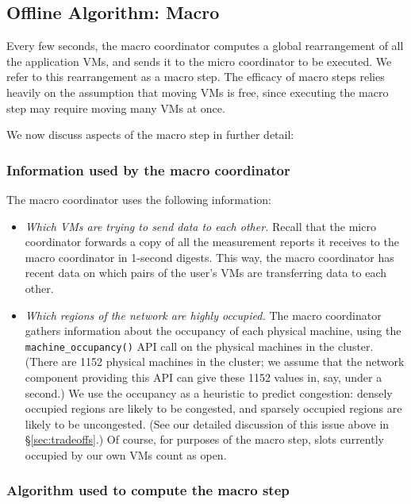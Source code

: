 \documentclass[11pt]{article}
\begin{document}
\FloatBarrier

\subsection{Offline Algorithm: Macro}

Every few seconds, the macro coordinator computes a global rearrangement of all the application VMs, and sends it to the micro coordinator to be executed.  We refer to this rearrangement as a macro step.  The efficacy of macro steps relies heavily on the assumption that moving VMs is free, since executing the macro step may require moving many VMs at once.

We now discuss aspects of the macro step in further detail:

\subsubsection{Information used by the macro coordinator}

The macro coordinator uses the following information:

\begin{itemize}
  \item {\em Which VMs are trying to send data to each other.}  Recall that the micro coordinator forwards a copy of all the measurement reports it receives to the macro coordinator in 1-second digests.  This way, the macro coordinator has recent data on which pairs of the user's VMs are transferring data to each other.
    
  \item {\em Which regions of the network are highly occupied.}  The macro coordinator gathers information about the occupancy of each physical machine, using the \texttt{machine\_occupancy()} API call on the physical machines in the cluster.  (There are 1152 physical machines in the cluster; we assume that the network component providing this API can give these 1152 values in, say, under a second.)   We use the occupancy as a heuristic to predict congestion: densely occupied regions are likely to be congested, and sparsely occupied regions are likely to be uncongested.  (See our detailed discussion of this issue above in \S\ref{sec:tradeoffs}.)  Of course, for purposes of the macro step, slots currently occupied by our own VMs count as open.
\end{itemize}

\subsubsection{Algorithm used to compute the macro step}
\end{document}
